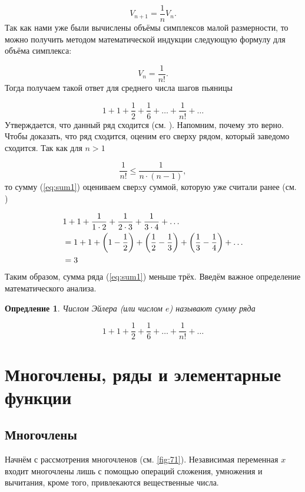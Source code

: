 \documentclass[12pt]{article}
\newtheorem{definition}{Опредление}[section]
\begin{document}
\begin{equation}
	V_{n+1} = \dfrac{1}{n} V_n.
\end{equation}
Так как нами уже были вычислены объёмы симплексов малой размерности, то можно получить методом математической индукции следующую формулу для объёма симплекса:

\begin{equation}
	V_n = \dfrac{1}{n!}.
\end{equation}
Тогда получаем такой ответ для среднего числа шагов пьяницы

\begin{equation}\label{eq:sum1}
	1 + 1 + \dfrac12 + \dfrac16 + \ldots + \dfrac{1}{n!} + \ldots
\end{equation}
Утверждается, что данный ряд сходится (см. \cite{sum}). Напомним, почему это верно. Чтобы доказать, что ряд сходится, оценим его сверху рядом, который заведомо сходится. Так как для $n > 1$

\begin{equation}
	\dfrac{1}{n!} \le \dfrac{1}{n \cdot (n-1)},
\end{equation}
то сумму (\ref{eq:sum1}) оцениваем сверxу суммой, которую уже считали ранее (см. \cite{sum})

\begin{equation}
\begin{split}
	&1 + 1 + \dfrac{1}{1\cdot 2} + \dfrac{1}{2\cdot 3} + \dfrac{1}{3\cdot 4} + \ldots \\
	&= 1 + 1 + \qty(1 - \dfrac12) + \qty(\dfrac12 - \dfrac13) + \qty(\dfrac13 - \dfrac14) + \ldots\\
	&=3
\end{split}
\end{equation}
Таким образом, сумма ряда (\ref{eq:sum1}) меньше трёх. Введём важное определение математического анализа.

\begin{definition}
	Числом Эйлера (или числом $e$) называют сумму ряда

	\begin{equation}
	1 + 1 + \dfrac12 + \dfrac16 + \ldots + \dfrac{1}{n!} + \ldots
	\end{equation}
\end{definition}

\section{Многочлены, ряды и элементарные функции} %
\subsection{Многочлены}
Начнём с рассмотрения многочленов (см. \ref{fig:71}). Независимая переменная $x$ входит многочлены лишь с помощью операций сложения, умножения и вычитания, кроме того, привлекаются вещественные числа. 
\end{document}
